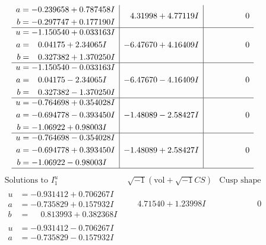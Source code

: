 \documentclass[1p]{elsarticle_modified}
\theoremstyle{definition}
\newcommand{\I}{\sqrt{-1}}
\begin{document}
$$\begin{array}{c|c|c}
\begin{aligned}
a &= -0.239658 + 0.787458 I \\
b &= -0.297747 + 0.177190 I\end{aligned}
 & \phantom{-}4.31998 + 4.77119 I & \phantom{-0.000000 } 0 \\ \hline\begin{aligned}
u &= -1.150540 + 0.033163 I \\
a &= \phantom{-}0.04175 + 2.34065 I \\
b &= \phantom{-}0.327382 + 1.370250 I\end{aligned}
 & -6.47670 + 4.16409 I & \phantom{-0.000000 } 0 \\ \hline\begin{aligned}
u &= -1.150540 - 0.033163 I \\
a &= \phantom{-}0.04175 - 2.34065 I \\
b &= \phantom{-}0.327382 - 1.370250 I\end{aligned}
 & -6.47670 - 4.16409 I & \phantom{-0.000000 } 0 \\ \hline\begin{aligned}
u &= -0.764698 + 0.354028 I \\
a &= -0.694778 - 0.393450 I \\
b &= -1.06922 + 0.98003 I\end{aligned}
 & -1.48089 - 2.58427 I & \phantom{-0.000000 } 0 \\ \hline\begin{aligned}
u &= -0.764698 - 0.354028 I \\
a &= -0.694778 + 0.393450 I \\
b &= -1.06922 - 0.98003 I\end{aligned}
 & -1.48089 + 2.58427 I & \phantom{-0.000000 } 0\\
 \hline 
 \end{array}$$\newpage$$\begin{array}{c|c|c}  
\text{Solutions to }I^u_{1}& \I (\text{vol} + \sqrt{-1}CS) & \text{Cusp shape}\\
 \hline 
\begin{aligned}
u &= -0.931412 + 0.706267 I \\
a &= -0.735829 + 0.157932 I \\
b &= \phantom{-}0.813993 + 0.382368 I\end{aligned}
 & \phantom{-}4.71540 + 1.23998 I & \phantom{-0.000000 } 0 \\ \hline\begin{aligned}
u &= -0.931412 - 0.706267 I \\
a &= -0.735829 - 0.157932 I \\

\end{aligned}
\end{array}$$
\end{document}
